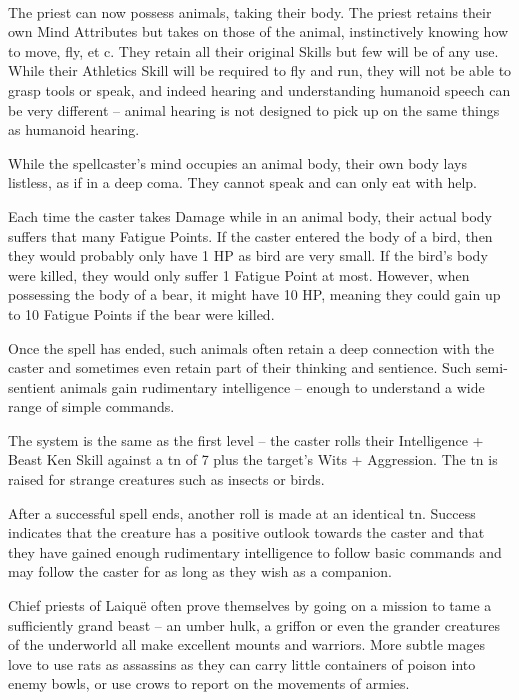 \documentclass[titlepage,a4paper,openany]{book}
\begin{document}
\begin{multicols}{2}
\spelllevel

\\
The priest can now possess animals, taking their body. The priest retains their own Mind Attributes but takes on those of the animal, instinctively knowing how to move, fly, et c. They retain all their original Skills but few will be of any use. While their Athletics Skill will be required to fly and run, they will not be able to grasp tools or speak, and indeed hearing and understanding humanoid speech can be very different -- animal hearing is not designed to pick up on the same things as humanoid hearing.

While the spellcaster's mind occupies an animal body, their own body lays listless, as if in a deep coma. They cannot speak and can only eat with help.

Each time the caster takes Damage while in an animal body, their actual body suffers that many Fatigue Points. If the caster entered the body of a bird, then they would probably only have 1 HP as bird are very small. If the bird's body were killed, they would only suffer 1 Fatigue Point at most. However, when possessing the body of a bear, it might have 10 HP, meaning they could gain up to 10 Fatigue Points if the bear were killed.

Once the spell has ended, such animals often retain a deep connection with the caster and sometimes even retain part of their thinking and sentience. Such semi-sentient animals gain rudimentary intelligence -- enough to understand a wide range of simple commands.

The system is the same as the first level -- the caster rolls their Intelligence + Beast Ken Skill against a \gls{tn} of 7 plus the target's Wits + Aggression. The \gls{tn} is raised for strange creatures such as insects or birds.

After a successful spell ends, another roll is made at an identical \gls{tn}. Success indicates that the creature has a positive outlook towards the caster and that they have gained enough rudimentary intelligence to follow basic commands and may follow the caster for as long as they wish as a companion.

Chief priests of Laiqu\"{e} often prove themselves by going on a mission to tame a sufficiently grand beast -- an umber hulk, a griffon or even the grander creatures of the underworld all make excellent mounts and warriors. More subtle mages love to use rats as assassins as they can carry little containers of poison into enemy bowls, or use crows to report on the movements of armies.


\end{multicols}
\end{document}
